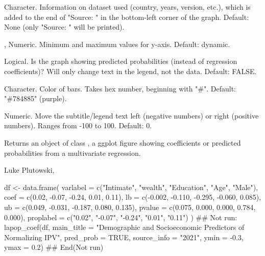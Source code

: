 \documentclass[a4paper]{book}
\begin{document}
\begin{Arguments}
\begin{ldescription}
\item[\code{source\_info}] Character.  Information on dataset used (country, years, version, etc.),
which is added to the end of "Source: " in the bottom-left corner of the graph.
Default: None (only "Source: " will be printed).

\item[\code{ymin}, \code{ymax}] Numeric.  Minimum and maximum values for y-axis. Default: dynamic.

\item[\code{pred\_prob}] Logical.  Is the graph showing predicted probabilities (instead of regression coefficients)?
Will only change text in the legend, not the data.  Default: FALSE.

\item[\code{color\_scheme}] Character.  Color of bars.  Takes hex number, beginning with "\#".
Default: "\#784885" (purple).

\item[\code{subtitle\_h\_just}] Numeric.  Move the subtitle/legend text left (negative numbers) or right (positive numbers).
Ranges from -100 to 100.  Default: 0.
\end{ldescription}
\end{Arguments}
%
\begin{Value}
Returns an object of class , a ggplot figure showing
coefficients or predicted probabilities from a multivariate regression.
\end{Value}
%
\begin{Author}
Luke Plutowski, 
\end{Author}
%
\begin{Examples}
\begin{ExampleCode}

df <- data.frame(
  varlabel = c("Intimate\nPartner", "wealth", "Education", "Age", "Male"),
  coef = c(0.02, -0.07, -0.24, 0.01, 0.11),
  lb = c(-0.002, -0.110, -0.295, -0.060, 0.085),
  ub = c(0.049, -0.031, -0.187, 0.080, 0.135),
  pvalue = c(0.075, 0.000, 0.000, 0.784, 0.000),
  proplabel = c("0.02", "-0.07", "-0.24", "0.01", "0.11")
)
## Not run: 
lapop_coef(df,
           main_title = "Demographic and Socioeconomic Predictors of Normalizing IPV",
           pred_prob = TRUE,
           source_info = "2021",
           ymin = -0.3,
           ymax = 0.2)
## End(Not run)

\end{ExampleCode}
\end{Examples}
\end{document}
